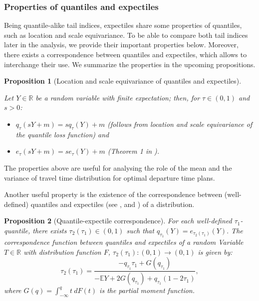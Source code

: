 \documentclass[preprint, 3p, authoryear]{elsarticle} %
\newtheorem{proposition}{Proposition}[section]
\theoremstyle{definition}
\theoremstyle{definition}
\theoremstyle{definition}
\theoremstyle{definition}
\theoremstyle{remark}
\begin{document}
\hypertarget{properties-of-quantiles-and-expectiles}{%
\subsubsection{Properties of quantiles and expectiles}\label{properties-of-quantiles-and-expectiles}}

Being quantile-alike tail indices, expectiles share some properties of quantiles, such as location and scale equivariance. To be able to compare both tail indices later in the analysis, we provide their important properties below. Moreover, there exists a correspondence between quantiles and expectiles, which allows to interchange their use. We summarize the properties in the upcoming propositions.

\begin{proposition}[Location and scale equivariance of quantiles and expectiles]
\protect\hypertarget{prp:propprops}{}\label{prp:propprops}

Let \(Y\in\mathbb R\) be a random variable with finite expectation; then, for \(\tau \in (0,1)\) and \(s>0\):

\begin{itemize}
\item
  \(q_\tau(sY+m) = sq_\tau(Y) + m\) (follows from location and scale equivariance of the quantile loss function) and
\item
  \(e_\tau(sY+m)=se_\tau(Y) + m\) (Theorem 1 in \citet{newey1987}).
\end{itemize}

\end{proposition}

The properties above are useful for analysing the role of the mean and the variance of travel time distribution for optimal departure time plans.

Another useful property is the existence of the correspondence between (well-defined) quantiles and expectiles (see \citet{jones1994}, \citet{yao1996} and \citet{waltrup2015}) of a distribution.

\begin{proposition}[Quantile-expectile correspondence]
\protect\hypertarget{prp:corr}{}\label{prp:corr}For each well-defined \(\tau_1\)-quantile, there exists \(\tau_2(\tau_1)\in(0,1)\) such that \(q_{\tau_1}(Y) = e_{\tau_2(\tau_1)}(Y).\)
The correspondence function between quantiles and expectiles of a random Variable \(T\in \mathbb R\) with distribution function \(F\), \(\tau_2(\tau_1):(0,1)\rightarrow(0,1)\) is given by:
\[\tau_2 (\tau_1) = \frac{-q_{\tau_1}\tau_1 + G(q_{\tau_1})}{-\mathbb EY + 2G(q_{\tau_1})+q_{\tau_1}(1-2\tau_1)},\]
where \(G(q) = \int_{-\infty}^qt~dF(t)\) is the partial moment function.
\end{proposition}
\end{document}
